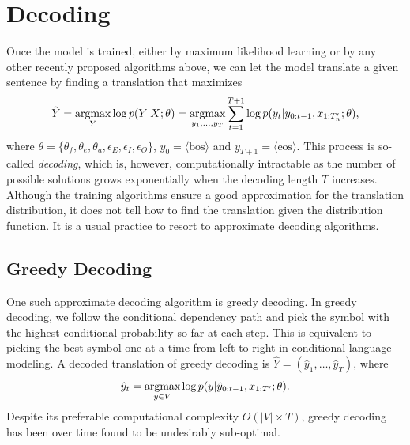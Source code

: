 \section{Decoding}
Once the model is trained, either by maximum likelihood learning or by any other recently proposed algorithms above, we can let the model translate a given sentence by finding a translation that maximizes 
\begin{equation}
\hat{Y} = \mathop{\text{argmax}}_{Y} \log p(Y|X; \theta) =\mathop{\text{argmax}}_{y_1, ..., y_T}\sum_{t=1}^{T+1} \log p(y_t| y_{0:t-1}, x_{1:T'_n}; \theta),
\end{equation}
where $\theta=\{\theta_f, \theta_e, \theta_a, \epsilon_E, \epsilon_I, \epsilon_O \}$, $y_0 = \langle \mathrm{bos}\rangle$ and $y_{T+1} = \langle \mathrm{eos}\rangle$. This process is so-called \textit{decoding}, which is, however, computationally intractable as the number of possible solutions grows exponentially when the decoding length $T$ increases. Although the training algorithms ensure a good approximation for the translation distribution, it does not tell how to find the translation given the distribution function. It is a usual practice to resort to approximate decoding algorithms.

\subsection{Greedy Decoding}

One such approximate decoding algorithm is greedy decoding. In greedy decoding, we follow the conditional dependency path and pick the symbol with the highest conditional probability so far at each step. This is equivalent to picking the best symbol one at a time from left to right in conditional language modeling. A decoded translation of greedy decoding is $\hat{Y} = (\hat{y}_1, \ldots, \hat{y}_T)$, where
\begin{equation}
\hat{y}_t =  \mathop{\text{argmax}}_{y \in V} \log p(y|\hat{y}_{0:t-1}, x_{1:T'}; \theta).
\end{equation}
Despite its preferable computational complexity $O(|V| \times T)$, greedy decoding has been over time found to be undesirably sub-optimal.%

